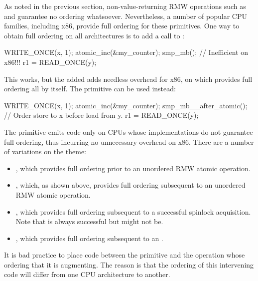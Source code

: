 As noted in the previous section, non-value-returning RMW operations
such as  and  guarantee no ordering whatsoever.
Nevertheless, a number of popular CPU families, including x86, provide
full ordering for these primitives.
One way to obtain full ordering on all architectures is to add a call
to :

\begin{VerbatimU}
	WRITE_ONCE(x, 1);
	atomic_inc(&my_counter);
	smp_mb(); // Inefficient on x86!!!
	r1 = READ_ONCE(y);
\end{VerbatimU}

This works, but the added  adds needless overhead for
x86, on which  provides full ordering all by itself.
The  primitive can be used instead:

\begin{VerbatimU}
	WRITE_ONCE(x, 1);
	atomic_inc(&my_counter);
	smp_mb__after_atomic(); // Order store to x before load from y.
	r1 = READ_ONCE(y);
\end{VerbatimU}

The  primitive emits code only on CPUs whose
 implementations do not guarantee full ordering, thus
incurring no unnecessary overhead on x86.
There are a number of variations on the  theme:

\begin{itemize}
 \item	{}, which provides full ordering prior
	to an unordered RMW atomic operation.

 \item	{}, which, as shown above, provides full
	ordering subsequent to an unordered RMW atomic operation.

 \item	{}, which provides full ordering subsequent
	to a successful spinlock acquisition.
	Note that  is always successful but 
	might not be.

 \item	{}, which provides full ordering
	subsequent to an .
\end{itemize}

It is bad practice to place code between the  primitive and the
operation whose ordering that it is augmenting.
The reason is that the ordering of this intervening code will differ from
one CPU architecture to another.


